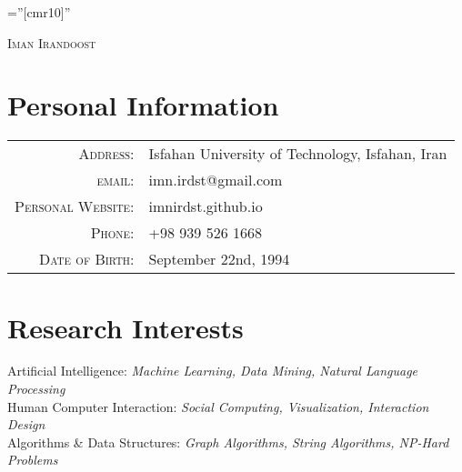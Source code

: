 \documentclass[a4paper,10pt]{article}
\makeatletter
\newcommand{\interestItem}[2]{
	\textbullet\textnormal{ #1: }\emph{\color{darkgray}\small #2}}
\newcommand{\linkSign}{
	{\footnotesize\space\faExternalLink}}
\newcommand{\myEmailLink}{mailto:imn.irdst@gmail.com}
\newcommand{\mySiteLink}{https://imnirdst.github.io/}
\makeatother
\begin{document}
	
	\pagestyle{empty} %
	
	\font\fb=''[cmr10]'' %
	
	\par{\centering
		{\Huge \textsc{Iman Irandoost}
		}\bigskip\par}
	
	
	\section{Personal Information}
		\begin{tabular}{rl}
			\textsc{Address:}   & Isfahan University of Technology, Isfahan, Iran \\
			\textsc{email:}     & imn.irdst@gmail.com\href{\myEmailLink}{\linkSign}\\
			\textsc{Personal Website:}     & imnirdst.github.io\href{\mySiteLink}{\linkSign}\\
			\textsc{Phone:}     & +98 939 526 1668\\
			\textsc{Date of Birth:} & September 22nd, 1994
		\end{tabular}
	\section{Research Interests}
		\interestItem{Artificial Intelligence}{Machine Learning, Data Mining, Natural Language Processing}\vspace{1 mm}\\
		\interestItem{Human Computer Interaction}{Social Computing, Visualization, Interaction Design}\vspace{1 mm} \\
		\interestItem{Algorithms \& Data Structures}{Graph Algorithms, String Algorithms, NP-Hard Problems}\vspace{1 mm}\\
\end{document}
